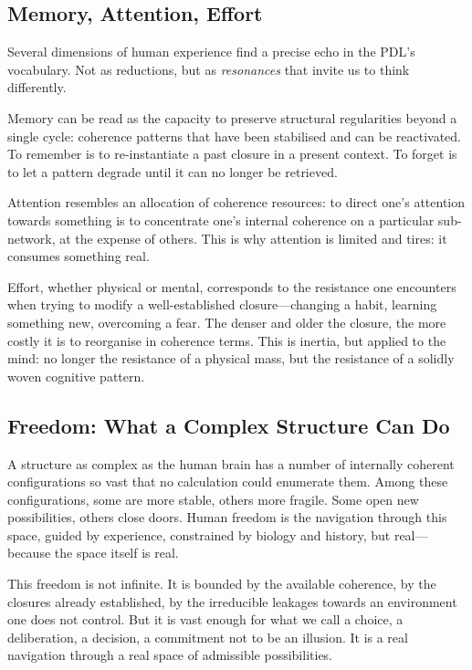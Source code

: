 \documentclass[12pt, a4paper, openright]{book}
\begin{document}
\subsection*{Memory, Attention, Effort}

Several dimensions of human experience find a precise echo in the PDL's vocabulary. Not as reductions, but as \emph{resonances} that invite us to think differently.

\medskip

Memory can be read as the capacity to preserve structural regularities beyond a single cycle: coherence patterns that have been stabilised and can be reactivated. To remember is to re-instantiate a past closure in a present context. To forget is to let a pattern degrade until it can no longer be retrieved.

\medskip

Attention resembles an allocation of coherence resources: to direct one's attention towards something is to concentrate one's internal coherence on a particular sub-network, at the expense of others. This is why attention is limited and tires: it consumes something real.

\medskip

Effort, whether physical or mental, corresponds to the resistance one encounters when trying to modify a well-established closure---changing a habit, learning something new, overcoming a fear. The denser and older the closure, the more costly it is to reorganise in coherence terms. This is inertia, but applied to the mind: no longer the resistance of a physical mass, but the resistance of a solidly woven cognitive pattern.

\subsection*{Freedom: What a Complex Structure Can Do}

A structure as complex as the human brain has a number of internally coherent configurations so vast that no calculation could enumerate them. Among these configurations, some are more stable, others more fragile. Some open new possibilities, others close doors. Human freedom is the navigation through this space, guided by experience, constrained by biology and history, but real---because the space itself is real.

\medskip

This freedom is not infinite. It is bounded by the available coherence, by the closures already established, by the irreducible leakages towards an environment one does not control. But it is vast enough for what we call a choice, a deliberation, a decision, a commitment not to be an illusion. It is a real navigation through a real space of admissible possibilities.
\end{document}
